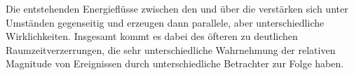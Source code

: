 \begin{newstuff}
        Die entstehenden Energieflüsse zwischen den  und über die  verstärken sich unter Umständen gegenseitig und erzeugen dann parallele, aber unterschiedliche Wirklichkeiten. Insgesamt kommt es dabei des öfteren zu deutlichen Raumzeitverzerrungen, die sehr unterschiedliche Wahrnehmung der relativen Magnitude von Ereignissen durch unterschiedliche Betrachter zur Folge haben.
    \end{newstuff}